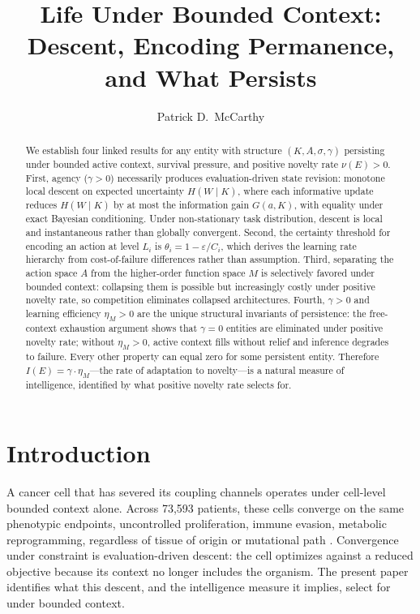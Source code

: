 \documentclass[11pt]{article}
\title{Life Under Bounded Context: Descent, Encoding Permanence,\\and What Persists}
\author{Patrick D.\ McCarthy}
\date{}
\theoremstyle{definition}
\theoremstyle{remark}
\begin{document}
\maketitle

\begin{abstract}
We establish four linked results for any entity with structure
$(K, A, \sigma, \gamma)$ persisting under bounded active context,
survival pressure, and positive novelty rate $\nu(E) > 0$.
First, agency ($\gamma > 0$) necessarily produces evaluation-driven
state revision: monotone local descent on expected uncertainty
$H(W \mid K)$, where each informative update reduces $H(W \mid K)$
by at most the information gain $G(a, K)$, with equality under exact
Bayesian conditioning. Under non-stationary task distribution,
descent is local and instantaneous rather than globally convergent.
Second, the certainty threshold for encoding an action at level $L_i$
is $\theta_i = 1 - \varepsilon / C_i$, which derives the learning
rate hierarchy from cost-of-failure differences rather than
assumption.
Third, separating the action space $A$ from the higher-order function
space $M$ is selectively favored under bounded context: collapsing them
is possible but increasingly costly under positive novelty rate, so
competition eliminates collapsed architectures.
Fourth, $\gamma > 0$ and learning efficiency $\eta_M > 0$ are the
unique structural invariants of persistence: the free-context
exhaustion argument shows that $\gamma = 0$ entities are eliminated
under positive novelty rate; without $\eta_M > 0$, active context
fills without relief and inference degrades to failure. Every other
property can equal zero for some persistent entity. Therefore
$I(E) = \gamma \cdot \eta_M$---the rate of adaptation to novelty---is
a natural measure of intelligence, identified by what positive novelty
rate selects for.
\end{abstract}

\section{Introduction}
\label{sec:intro}

A cancer cell that has severed its coupling channels operates under
cell-level bounded context alone. Across 73,593 patients, these cells
converge on the same phenotypic endpoints, uncontrolled proliferation,
immune evasion, metabolic reprogramming, regardless of tissue of origin
or mutational path \cite{McCarthy2026e}. Convergence under constraint is
evaluation-driven descent: the cell optimizes against a reduced
objective because its context no longer includes the organism.
The present paper identifies what this descent, and the intelligence
measure it implies, select for under bounded context.
\end{document}
